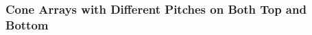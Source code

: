 \documentclass[12pt]{article}
\numberwithin{equation}{section}
\newcommand{\red}[1]{\textcolor{red}{[#1]}} %
\numberwithin{equation}{section}
\begin{document}
\begin{outline}[enumerate]

 
 
\end{outline}

\subsubsection{Cone Arrays with Different Pitches on Both Top and Bottom}
\end{document}
